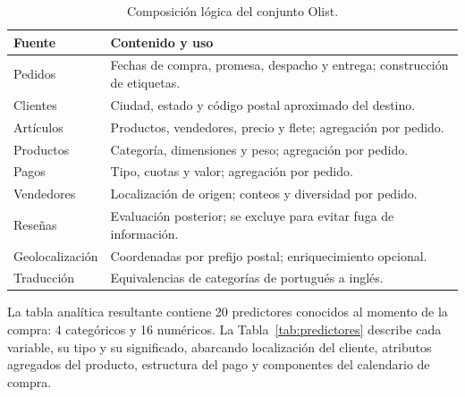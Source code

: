 \documentclass[journal]{IEEEtran}
\begin{document}
\begin{table}[t]
\caption{Composición lógica del conjunto Olist.}
\label{tab:datos}
\centering\scriptsize
\begin{tabular}{p{2.5cm}p{5.1cm}}
\toprule
Fuente & Contenido y uso \\
\midrule
Pedidos & Fechas de compra, promesa, despacho y entrega; construcción de etiquetas. \\
Clientes & Ciudad, estado y código postal aproximado del destino. \\
Artículos & Productos, vendedores, precio y flete; agregación por pedido. \\
Productos & Categoría, dimensiones y peso; agregación por pedido. \\
Pagos & Tipo, cuotas y valor; agregación por pedido. \\
Vendedores & Localización de origen; conteos y diversidad por pedido. \\
Reseñas & Evaluación posterior; se excluye para evitar fuga de información. \\
Geolocalización & Coordenadas por prefijo postal; enriquecimiento opcional. \\
Traducción & Equivalencias de categorías de portugués a inglés. \\
\bottomrule
\end{tabular}
\end{table}

La tabla analítica resultante contiene 20 predictores conocidos al momento de la compra: 4 categóricos y 16 numéricos. La Tabla~\ref{tab:predictores} describe cada variable, su tipo y su significado, abarcando localización del cliente, atributos agregados del producto, estructura del pago y componentes del calendario de compra.
\end{document}
